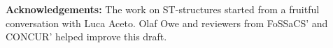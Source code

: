 \documentclass[submission,copyright,creativecommons]{eptcs}
\begin{document}
\vspace{1ex}\noindent\textbf{Acknowledgements: }
The work on ST-structures started from a fruitful conversation with Luca Aceto.
Olaf Owe and reviewers from FoSSaCS' and CONCUR' helped improve this draft.










\end{document}
